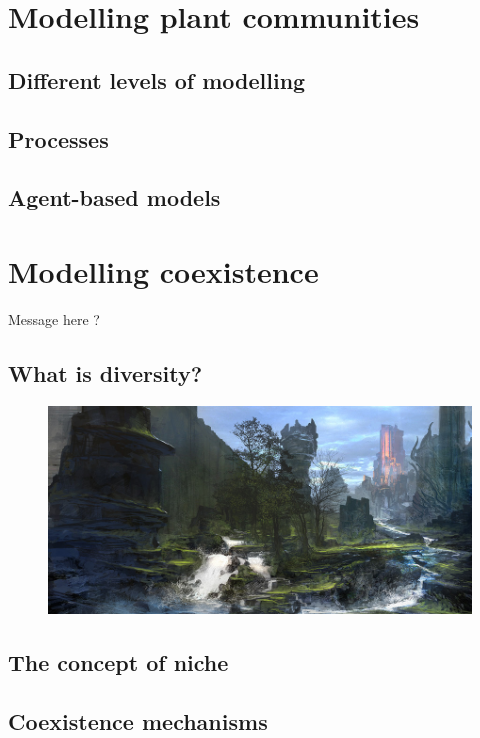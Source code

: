 \section{Modelling plant communities}

\subsection{Different levels of modelling}

\subsection{Processes}

\subsection{Agent-based models}


\section{Modelling coexistence}
Message here ?

\subsection{What is diversity?}
\begin{figure}
\includegraphics[scale=1]{./Introduction/graphics/plankton.jpg}
\end{figure}

\subsection{The concept of niche}


\subsection{Coexistence mechanisms}

